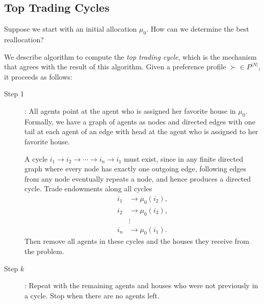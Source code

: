 \subsection{Top Trading Cycles}

Suppose we start with an initial allocation $\mu_0$. How can we determine the best reallocation?

We describe algorithm to compute the \emph{top trading cycle}, which is the mechanism that agrees with the result of this algorithm. Given a preference profile $\succ \in P^{\left| N \right|}$, it proceeds as follows:
\begin{description}
	\item[Step 1]: All agents point at the agent who is assigned her favorite house in $\mu_0$. Formally, we have a graph of agents as nodes and directed edges with one tail at each agent of an edge with head at the agent who is assigned to her favorite house.

	A cycle $i_1 \to i_2 \to \cdots \to i_n \to i_1$ must exist, since in any finite directed graph where every node has exactly one outgoing edge, following edges from any node eventually repeats a node, and hence produces a directed cycle. Trade endowments along all cycles
	\begin{align*}
		i_1 &\to \mu_0(i_2), \\
		i_2 &\to \mu_0(i_3), \\
		&\vdots \\
		i_n &\to \mu_0(i_1).
	\end{align*}
	Then remove all agents in these cycles and the houses they receive from the problem.
	\item[Step $k$]: Repeat with the remaining agents and houses who were not previously in a cycle. Stop when there are no agents left.
\end{description}

